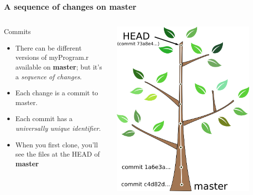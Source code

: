 \documentclass{beamer}
\begin{document}
\begin{frame}
  \frametitle{A sequence of changes on master}
  \begin{columns}[T]
    \begin{column}{.5\textwidth}
      \begin{block}{Commits}
        \begin{itemize}
          \item There can be different versions of myProgram.r available on
            \textbf{master}; but it's a \emph{sequence of changes}.

          \item Each change is a \alert{commit to master}.

          \item Each commit has a \emph{universally unique identifier}.

          \item When you first clone, you'll see the files at the \alert{HEAD}
            of \textbf{master}
        \end{itemize}
      \end{block}
    \end{column}
    \begin{column}{.5\textwidth}
      \includegraphics[width=\textwidth]{tree_mastercommits_head.png}
    \end{column}
  \end{columns}
\end{frame}
\end{document}
